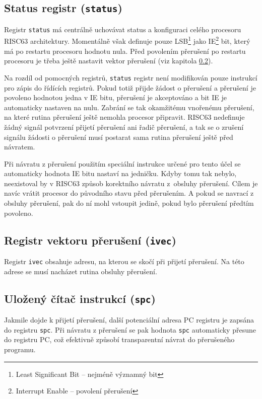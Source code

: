 \documentclass[
  digital, %
  color,   %
  table,   %
  twoside, %
  nolof,   %
  nolot,   %
]{fithesis3}
\begin{document}
\subsection{Status registr (\texttt{status})}
\label{subsec:statusr}
Registr \texttt{status} má centrálně uchovávat status a konfiguraci celého procesoru RISC63 architektury. Momentálně však definuje pouze LSB\footnote{Least Significant Bit -- nejméně významný bit} jako IE\footnote{Interrupt Enable -- povolení přerušení} bit, který má po restartu procesoru hodnotu nula. Před povolením přerušení po restartu procesoru je třeba ještě nastavit vektor přerušení (viz kapitola \ref{subsec:ivec}).

Na rozdíl od pomocných registrů, \texttt{status} registr není modifikován pouze instrukcí pro zápis do řídících registrů. Pokud totiž přijde žádost o přerušení a přerušení je povoleno hodnotou jedna v IE bitu, přerušení je akceptováno a bit IE je automaticky nastaven na nulu. Zabrání se tak okamžitému vnořenému přerušení, na které rutina přerušení ještě nemohla procesor připravit. RISC63 nedefinuje žádný signál potvrzení přijetí přerušení ani řadič přerušení, a tak se o zrušení signálu žádosti o přerušení musí postarat sama rutina přerušení ještě před návratem.

Při návratu z přerušení použitím speciální instrukce určené pro tento účel se automaticky hodnota IE bitu nastaví na jedničku. Kdyby tomu tak nebylo, neexistoval by v RISC63 způsob korektního návratu z~obsluhy přerušení. Cílem je navíc vrátit procesor do původního stavu před přerušením. A pokud se navrací z obsluhy přerušení, pak do ní mohl vstoupit jedině, pokud bylo přerušení předtím povoleno.

\subsection{Registr vektoru přerušení (\texttt{ivec})}
\label{subsec:ivec}
Registr \texttt{ivec} obsahuje adresu, na kterou se skočí při přijetí přerušení. Na této adrese se musí nacházet rutina obsluhy přerušení.

\subsection{Uložený čítač instrukcí (\texttt{spc})}
Jakmile dojde k přijetí přerušení, další potenciální adresa PC registru je zapsána do registru \texttt{spc}. Při návratu z přerušení se pak hodnota \texttt{spc} automaticky přesune do registru PC, což efektivně způsobí transparentní návrat do přerušeného programu.
\end{document}

